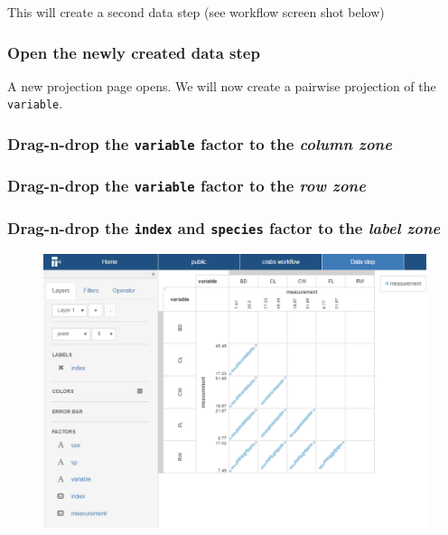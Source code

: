 \documentclass[]{book}
\theoremstyle{definition}
\theoremstyle{definition}
\theoremstyle{remark}
\begin{document}
This will create a second data step (see workflow screen shot below)

\subsubsection{Open the newly created data
step}\label{open-the-newly-created-data-step-1}

A new projection page opens. We will now create a pairwise projection of
the \texttt{variable}.

\subsubsection{\texorpdfstring{Drag-n-drop the \texttt{variable} factor
to the \emph{column
zone}}{Drag-n-drop the variable factor to the column zone}}\label{drag-n-drop-the-variable-factor-to-the-column-zone}

\subsubsection{\texorpdfstring{Drag-n-drop the \texttt{variable} factor
to the \emph{row
zone}}{Drag-n-drop the variable factor to the row zone}}\label{drag-n-drop-the-variable-factor-to-the-row-zone-1}

\subsubsection{\texorpdfstring{Drag-n-drop the \texttt{index} and
\texttt{species} factor to the \emph{label
zone}}{Drag-n-drop the index and species factor to the label zone}}\label{drag-n-drop-the-index-and-species-factor-to-the-label-zone}

\begin{figure}[htbp]
\centering
\includegraphics{images/projection_pairwise.png}
\caption{}
\end{figure}
\end{document}
